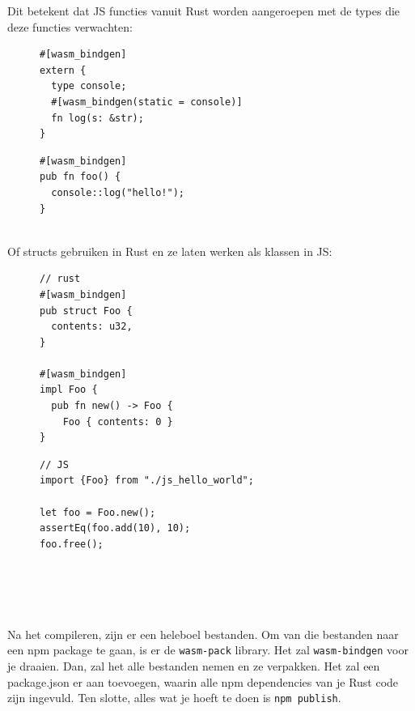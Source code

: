 \clearpage

Dit betekent dat JS functies vanuit Rust worden aangeroepen met de types die deze functies
verwachten:
\begin{figure}[h]
\begin{minipage}{.5\textwidth}
\begin{verbatim}
#[wasm_bindgen]
extern {
  type console;
  #[wasm_bindgen(static = console)]
  fn log(s: &str);
}
\end{verbatim}
\end{minipage}\hfill
\begin{minipage}{.5\textwidth}
\begin{verbatim}
#[wasm_bindgen]
pub fn foo() {
  console::log("hello!");
}


\end{verbatim}
\end{minipage}
\end{figure}

Of structs gebruiken in Rust en ze laten werken als klassen in JS:

\begin{figure}[h]
\begin{minipage}{.5\textwidth}
\begin{verbatim}
// rust
#[wasm_bindgen]
pub struct Foo {
  contents: u32,
}

#[wasm_bindgen]
impl Foo {
  pub fn new() -> Foo {
    Foo { contents: 0 }
}
\end{verbatim}
\end{minipage}\hfill
\begin{minipage}{.5\textwidth}
\begin{verbatim}
// JS
import {Foo} from "./js_hello_world";

let foo = Foo.new();
assertEq(foo.add(10), 10);
foo.free();





\end{verbatim}
\end{minipage}
\end{figure}

Na het compileren, zijn er een heleboel bestanden. Om van die bestanden naar een npm package te
gaan, is er de \texttt{wasm-pack} library. Het zal \texttt{wasm-bindgen} voor je
draaien. Dan, zal het alle bestanden nemen en ze verpakken. Het zal een package.json  er aan
toevoegen, waarin alle npm dependencies van je Rust code zijn ingevuld. Ten slotte, alles wat je
hoeft te doen is \texttt{npm publish}.

